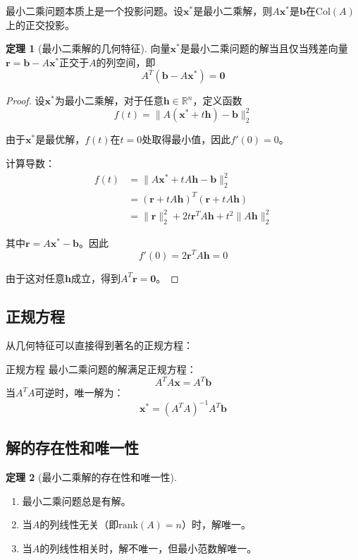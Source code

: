 \documentclass[11pt,a4paper]{ctexart}
\theoremstyle{definition}
\newtheorem{theorem}{定理}[section]
\newcommand{\RR}{\mathbb{R}}
\newcommand{\rank}{\text{rank}}
\newcommand{\Col}{\text{Col}}
\begin{document}
最小二乘问题本质上是一个投影问题。设$\boldsymbol{x}^*$是最小二乘解，则$A\boldsymbol{x}^*$是$\boldsymbol{b}$在$\Col(A)$上的正交投影。

\begin{theorem}[最小二乘解的几何特征]
向量$\boldsymbol{x}^*$是最小二乘问题的解当且仅当残差向量$\boldsymbol{r} = \boldsymbol{b} - A\boldsymbol{x}^*$正交于$A$的列空间，即
$$A^T(\boldsymbol{b} - A\boldsymbol{x}^*) = \boldsymbol{0}$$
\end{theorem}

\begin{proof}
设$\boldsymbol{x}^*$为最小二乘解，对于任意$\boldsymbol{h} \in \RR^n$，定义函数
$$f(t) = \|A(\boldsymbol{x}^* + t\boldsymbol{h}) - \boldsymbol{b}\|_2^2$$

由于$\boldsymbol{x}^*$是最优解，$f(t)$在$t=0$处取得最小值，因此$f'(0) = 0$。

计算导数：
\begin{align}
f(t) &= \|A\boldsymbol{x}^* + tA\boldsymbol{h} - \boldsymbol{b}\|_2^2 \\
&= (\boldsymbol{r} + tA\boldsymbol{h})^T(\boldsymbol{r} + tA\boldsymbol{h}) \\
&= \|\boldsymbol{r}\|_2^2 + 2t\boldsymbol{r}^TA\boldsymbol{h} + t^2\|A\boldsymbol{h}\|_2^2
\end{align}

其中$\boldsymbol{r} = A\boldsymbol{x}^* - \boldsymbol{b}$。因此
$$f'(0) = 2\boldsymbol{r}^TA\boldsymbol{h} = 0$$

由于这对任意$\boldsymbol{h}$成立，得到$A^T\boldsymbol{r} = \boldsymbol{0}$。
\end{proof}

\subsection{正规方程}

从几何特征可以直接得到著名的正规方程：

\begin{maintheorem}{正规方程}
最小二乘问题的解满足正规方程：
$$A^TA\boldsymbol{x} = A^T\boldsymbol{b}$$
当$A^TA$可逆时，唯一解为：
$$\boldsymbol{x}^* = (A^TA)^{-1}A^T\boldsymbol{b}$$
\end{maintheorem}

\subsection{解的存在性和唯一性}

\begin{theorem}[最小二乘解的存在性和唯一性]
\begin{enumerate}[label=(\roman*)]
\item 最小二乘问题总是有解。
\item 当$A$的列线性无关（即$\rank(A) = n$）时，解唯一。
\item 当$A$的列线性相关时，解不唯一，但最小范数解唯一。
\end{enumerate}
\end{theorem}
\end{document}
